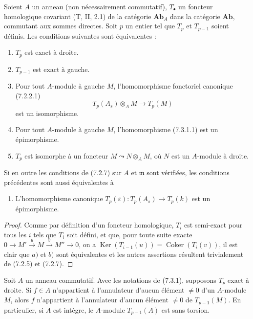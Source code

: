 \begin{proposition}[7.3.1]
Soient $A$ un anneau (non nécessairement commutatif), $T_\bullet$ un foncteur
homologique covariant \textup{(T, II, 2.1)} de la catégorie $\boldsymbol{Ab}_A$ dans la
catégorie $\boldsymbol{Ab}$, commutant aux sommes directes. Soit $p$ un entier tel
que $T_p$ et $T_{p-1}$ soient définis. Les conditions suivantes sont
équivalentes :
\begin{enumerate}
  \item[a)] $T_p$ est exact à droite.
  \item[b)] $T_{p-1}$ est exact à gauche.
  \item[c)] Pour tout $A$-module à gauche $M$, l'homomorphisme fonctoriel
    canonique \textup{(7.2.2.1)}
    \[
      T_p(A_s)\otimes_A M\longrightarrow T_p(M)
      \tag{7.3.1.1}\label{III.7.3.1.1.fr}
    \]
    est un isomorphisme.
  \item[d)] Pour tout $A$-module à gauche $M$, l'homomorphisme \textup{(7.3.1.1)} est
    un épimorphisme.
  \item[e)] $T_p$ est isomorphe à un foncteur
    $M\leadsto N\otimes_A M$, où $N$ est un $A$-module à droite.
\end{enumerate}

Si en outre les conditions de \textup{(7.2.7)} sur $A$ et $\mathfrak m$ sont vérifiées,
les conditions précédentes sont aussi équivalentes à
\begin{enumerate}
  \item[f)] L'homomorphisme canonique
    $T_p(\varepsilon):T_p(A_s)\longrightarrow T_p(k)$
    est un épimorphisme.
\end{enumerate}
\end{proposition}

\begin{proof}
Comme par définition d'un foncteur homologique, $T_i$ est semi-exact pour tous
les $i$ tels que $T_i$ soit défini, et que, pour toute suite exacte
$0\longrightarrow M'\xrightarrow{u}M\xrightarrow{v}M''\longrightarrow0$,
on a
$\operatorname{Ker}(T_{i-1}(u))=\operatorname{Coker}(T_i(v))$,
il est clair que $a)$ et $b)$ sont équivalentes et les autres assertions
résultent trivialement de (7.2.5) et (7.2.7).
\end{proof}

\begin{corollary}[7.3.2]
Soit $A$ un anneau commutatif. Avec les notations de \textup{(7.3.1)}, supposons $T_p$
exact à droite. Si $f\in A$ n'appartient à l'annulateur d'aucun élément
$\ne0$ d'un $A$-module $M$, alors $f$ n'appartient à l'annulateur d'aucun
élément $\ne0$ de $T_{p-1}(M)$. En particulier, si $A$ est intègre, le
$A$-module $T_{p-1}(A)$ est sans torsion.
\end{corollary}

